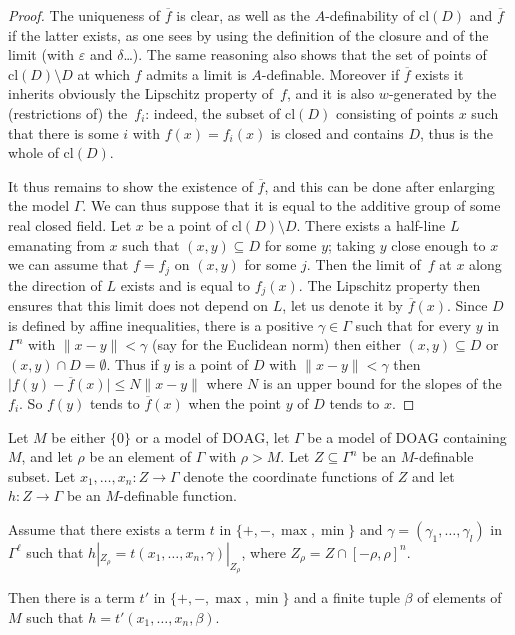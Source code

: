 \documentclass[JEP,XML,SOM,Unicode,ThmDefs,NoEqCountersInSection,published]{cedram}
\newcommand{\abs}[1]{\mathopen|#1\mathclose|}
\newcommand{\cl}{\mathrm{cl}}
\newcommand{\DOAG}{\mathrm{DOAG}}
\let\epsilon\varepsilon
\let\subset\subseteq
\theoremstyle{plain}
\theoremstyle{definition}
\begin{document}
\begin{proof}
The uniqueness of $\overline f$ is clear, as well
as the $A$-definability of $\cl (D)$ and $\overline f$
if the latter exists, as one sees by
using the definition of the closure and of the limit
(with $\epsilon$ and $\delta$\ldots). The same reasoning
also shows that the set of points of $\cl (D) \setminus D$ at which $f$
admits a limit is $A$-definable.
Moreover if $\overline f$ exists it inherits obviously the Lipschitz
property of~$f$, and it is also $w$-generated by the (restrictions of)
the~$f_i$: indeed, the subset of $\cl (D)$ consisting of points $x$
such that there is some $i$ with $f(x)=f_i(x)$ is closed and contains $D$, thus is the whole of $\cl (D)$.

It thus remains to show the existence of $\overline f$,
and this can be done after enlarging the model $\Gamma$.
We can thus suppose that it is equal to the additive group of some
real closed field.
Let $x$ be a point of $\cl (D) \setminus D$.
There exists a half-line $L$ emanating from
$x$ such that $(x,y)\subset D$ for some $y$;
taking $y$ close enough to $x$ we can assume that $f=f_j$ on
$(x,y)$ for some $j$. Then the limit of~$f$
at $x$ along the direction of $L$ exists and is equal to $f_j(x)$.
The Lipschitz property then ensures
that this limit does not depend on $L$,
let us
denote it by $\overline f(x)$. Since $D$
is defined by affine inequalities, there is a positive
$\gamma\in \Gamma$ such that for every $y$
in $\Gamma^n$ with $\|x-y\|<\gamma$
(say for the Euclidean norm) then either $(x,y)\subset D$
or $(x,y)\cap D=\emptyset$. Thus if $y$ is a point of $D$
with $\|x-y\|<\gamma$ then
$\abs{f(y)-\overline f(x)}\leq N\|x-y\|$
where $N$ is an upper bound for the slopes of the $f_i$.
So $f(y)$ tends to $\overline f(x)$ when the point $y$
of $D$ tends to $x$.
\end{proof}

\begin{lemm} \label{lem:comp-l-gen}
Let $M$ be either $\{0\}$ or a model of $\DOAG$, let
$\Gamma$ be a model of $\DOAG$
containing $M$, and let $\rho$
be an element of $\Gamma$
with $\rho >M$.
Let $Z\subseteq \Gamma^n$ be
an $M$-definable subset. Let $x_1,\ldots,x_n:Z \to \Gamma$ denote the coordinate functions of $Z$ and let $h:Z\to \Gamma$ be an
$M$-definable function.

Assume that there
exists a term $t$
in
$\{+,-,\max,\min\}$ and
$\gamma=(\gamma_1,\ldots,\gamma_l)$
in $\Gamma^\ell$
such that $h|_{Z_\rho}=t(x_1,\ldots,x_n,\gamma)|_{Z_\rho}$,
where $Z_\rho=Z\cap [-\rho,\rho]^n$.

Then there is a term $t'$ in $\{+,-,\max,\min\}$ and
a finite tuple $\beta$ of elements of~$M$ such that $h=t'(x_1,\ldots,x_n,\beta)$.
\end{lemm}
\end{document}
